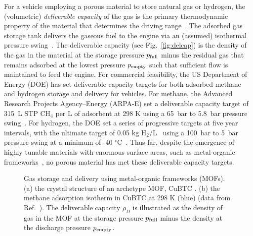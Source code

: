 For a vehicle employing a porous material to store natural gas or hydrogen, the (volumetric) \emph{deliverable capacity} of the gas is the primary thermodynamic property of the material that determines the driving range~\cite{mason2014evaluating}. The adsorbed gas storage tank delivers the gaseous fuel to the engine via an (assumed) isothermal pressure swing~\cite{sircar2002pressure}. The deliverable capacity (see Fig.~\ref{fig:delcap}) is the density of the gas in the material at the storage pressure $p_{\text{full}}$ minus the residual gas that remains adsorbed at the lowest pressure $p_{\text{empty}}$ such that sufficient flow is maintained to feed the engine.
For commercial feasibility, the US Department of Energy (DOE) has set deliverable capacity targets for both adsorbed methane and hydrogen storage and delivery for vehicles. For methane, the Advanced Research Projects Agency--Energy (ARPA-E) set a deliverable capacity target of 315\ L STP CH$_4$ per L of adsorbent at 298 K using a 65\ bar to 5.8\ bar pressure swing~\cite{simon2015materials}. For hydrogen, the DOE set a series of progressive targets at five year intervals, with the ultimate target of 0.05 kg H$_2$/L~\cite{h2targetsDOE} using a 100\ bar to 5\ bar pressure swing at a minimum of -40 $^\circ$C~\cite{allendorf2018assessment}. Thus far, despite the emergence of highly tunable materials with enormous surface areas, such as metal-organic frameworks~\cite{furukawa2013chemistry}, no porous material has met these deliverable capacity targets. 

\begin{figure}
    \centering
    \qquad
    \caption{Gas storage and delivery using metal-organic frameworks (MOFs). (a) the crystal structure of an archetype MOF, CuBTC \cite{chui1999chemically}. (b) the methane adsorption isotherm in CuBTC \cite{chui1999chemically} at 298 K (blue) (data from Ref.~\cite{mason2014evaluating}). The deliverable capacity $\rho_D$ is illustrated as the density of gas in the MOF at the storage pressure $p_{\text{full}}$ minus the density at the discharge pressure $p_{\text{empty}}$.
    }
    \label{fig:fig1}
\end{figure}

